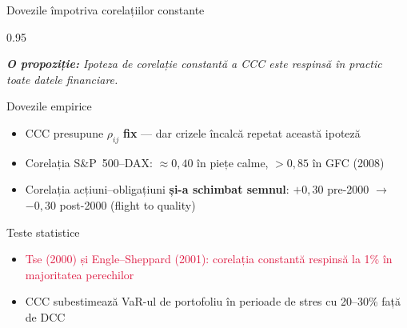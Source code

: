 \documentclass[9pt, aspectratio=169, t]{beamer}
\begin{document}
\begin{frame}{Dovezile împotriva corelațiilor constante}
    \begin{cminipage}{0.95\textwidth}
    {\footnotesize
    \textit{\textbf{O propoziție:} Ipoteza de corelație constantă a CCC este respinsă în practic toate datele financiare.}
    \vspace{0.2cm}
    \begin{block}{Dovezile empirice}
        \begin{itemize}\setlength{\itemsep}{2pt}
            \item CCC presupune $\rho_{ij}$ \textbf{fix} --- dar crizele încalcă repetat această ipoteză
            \item Corelația S\&P~500--DAX: $\approx 0{,}40$ în piețe calme, $> 0{,}85$ în GFC (2008)
            \item Corelația acțiuni--obligațiuni \textbf{și-a schimbat semnul}: $+0{,}30$ pre-2000 $\to$ $-0{,}30$ post-2000 (flight to quality)
        \end{itemize}
    \end{block}
    \vspace{0.1cm}
    \begin{alertblock}{Teste statistice}
        \begin{itemize}\setlength{\itemsep}{0pt}
            \item \textcolor{Crimson}{Tse (2000) și Engle--Sheppard (2001): corelația constantă respinsă la 1\% în majoritatea perechilor}
            \item CCC subestimează VaR-ul de portofoliu în perioade de stres cu 20--30\% față de DCC
        \end{itemize}
    \end{alertblock}
    }
    \end{cminipage}
\end{frame}
\end{document}
